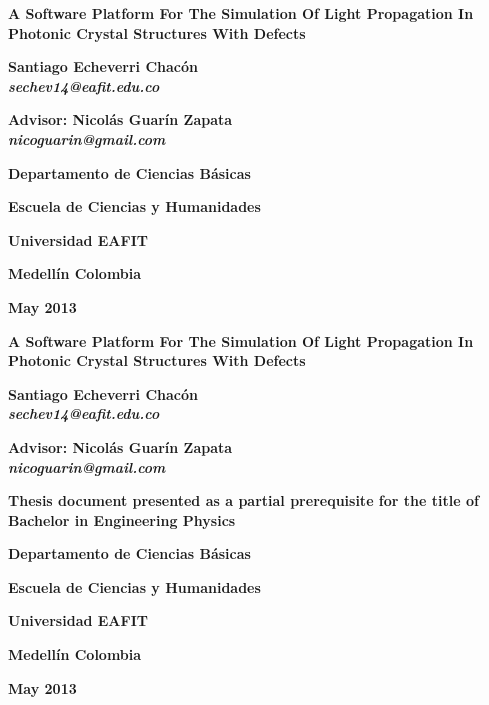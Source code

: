 \documentclass[office, 10pt]{book}
\makeatletter
\newcommand\portada{
\begin{titlepage}
		\begin{center}
			{\large \bf  A Software Platform For The Simulation Of Light Propagation In Photonic Crystal Structures With Defects}
			\vfill
			{\large\bf Santiago Echeverri Chacón
			\\\emph{sechev14@eafit.edu.co}\par}
			{\large\bf Advisor: Nicolás Guarín Zapata
			\\\emph{nicoguarin@gmail.com}}
			\vfill
								\vfill
			{\large\bf Departamento de Ciencias Básicas \par}
			{\large\bf Escuela de Ciencias y Humanidades \par}
			{\large\bf Universidad EAFIT \par}
			{\large\bf Medellín Colombia\par}
			{\large\bf May 2013 \par}
		\end{center}
\end{titlepage}
}
\newcommand\contraportada{
	\begin{titlepage}
		\begin{center}
			{\large \bf A Software Platform For The Simulation Of Light Propagation In Photonic Crystal Structures With Defects} 
			\vfill
			{\large\bf Santiago Echeverri Chacón
			\\\emph{sechev14@eafit.edu.co}\par}
			{\large\bf Advisor: Nicolás Guarín Zapata
			\\\emph{nicoguarin@gmail.com}}
			\vfill
			{\large\bf Thesis document presented as a partial prerequisite for the title of Bachelor in Engineering Physics \par}
			\vfill
					\vfill
			{\large\bf Departamento de Ciencias Básicas \par}
			{\large\bf Escuela de Ciencias y Humanidades \par}
			{\large\bf Universidad EAFIT \par}
			{\large\bf Medellín Colombia\par}
			{\large\bf May 2013 \par}
		\end{center}
\end{titlepage}
}
\makeatother
\begin{document}
\portada
\contraportada

\tableofcontents
\clearpage















\end{document}
